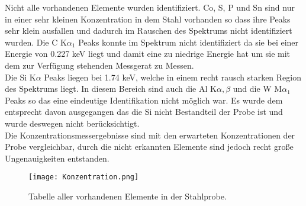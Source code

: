 Nicht alle vorhandenen Elemente wurden identifiziert. Co, S, P und Sn sind nur in einer sehr kleinen Konzentration in dem Stahl vorhanden so dass ihre Peaks sehr klein ausfallen und dadurch im Rauschen des Spektrums nicht identifiziert wurden. Die C K$\alpha_1 $ Peaks konnte im Spektrum nicht identifiziert da sie bei einer Energie von 0.227 keV liegt und damit eine zu niedrige Energie hat um sie mit dem zur Verfügung stehenden Messgerat zu Messen.\\

Die Si K$\alpha $ Peaks liegen bei 1.74 keV, welche in einem recht rausch starken Region des Spektrums liegt. In diesem Bereich sind auch die Al K$\alpha , \beta $ und die W M$\alpha_1 $ Peaks so das eine eindeutige Identifikation nicht möglich war. Es wurde dem entsprecht davon ausgegangen das die Si nicht Bestandteil der Probe ist und wurde deswegen nicht berücksichtigt.\\

Die Konzentrationsmessergebnisse sind mit den erwarteten Konzentrationen der Probe vergleichbar, durch die nicht erkannten Elemente sind jedoch recht große Ungenauigkeiten entstanden.\\

\begin{figure}[h]
 \centering
 \texttt{[image: Konzentration.png]}
 \caption[Filter Tabelle]{Tabelle aller vorhandenen Elemente in der Stahlprobe.}
 \label{fig:Konzentration}
\end{figure}

